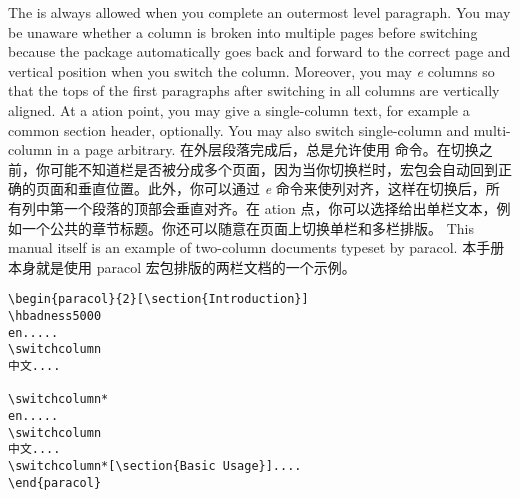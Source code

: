 \begin{paracol}{2}

\switchcolumn


\switchcolumn*
The {\em\Uidx\cswitch} is always allowed when you complete an outermost
level paragraph.  You may be unaware whether a column is broken into
multiple pages before switching because the package automatically goes
back and forward to the correct page and vertical position when you switch
the column.  Moreover, you may {\em\Uidx\sync{}e} columns so that the tops
of the first paragraphs after switching in all columns are vertically
aligned.  At a \sync{}ation point, you may give a single-column text,
for example a common section header, optionally.  You may also switch
single-column and multi-column in a page arbitrary.
\switchcolumn
在外层段落完成后，总是允许使用 {\em\Uidx\cswitch} 命令。在切换之前，你可能不知道栏是否被分成多个页面，因为当你切换栏时，宏包会自动回到正确的页面和垂直位置。此外，你可以通过 {\em\Uidx\sync{}e} 命令来使列对齐，这样在切换后，所有列中第一个段落的顶部会垂直对齐。在 \sync{}ation 点，你可以选择给出单栏文本，例如一个公共的章节标题。你还可以随意在页面上切换单栏和多栏排版。
\switchcolumn*
This manual itself is an example of two-column documents typeset by
\textsf{paracol}.  
\switchcolumn
本手册本身就是使用 \textsf{paracol} 宏包排版的两栏文档的一个示例。

\end{paracol}
\begin{Verbatim}
\begin{paracol}{2}[\section{Introduction}]
\hbadness5000
en.....
\switchcolumn
中文....

\switchcolumn*
en.....
\switchcolumn
中文....
\switchcolumn*[\section{Basic Usage}]....
\end{paracol}
\end{Verbatim}